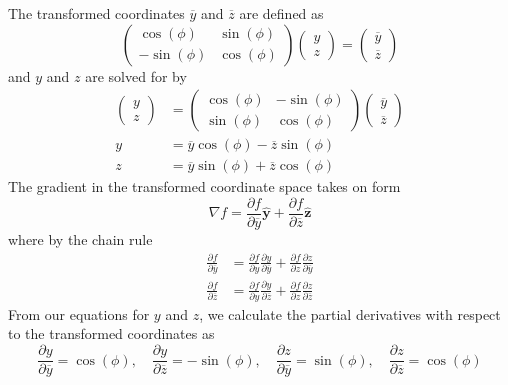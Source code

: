 \documentclass[a4paper]{article}
\begin{document}
The transformed coordinates \( \overline{y} \) and \( \overline{z} \) are defined as 
\[
	\begin{pmatrix}
		\cos\!\left(\phi\right) & \sin\!\left(\phi\right) \\
		-\sin\!\left(\phi\right) & \cos\!\left(\phi\right)
	\end{pmatrix}
	\begin{pmatrix}
		y \\
		z
	\end{pmatrix}
	=
	\begin{pmatrix}
		\overline{y} \\
		\overline{z}
	\end{pmatrix}
\]
and \( y \) and \( z \) are solved for by
\begin{align*}
	\begin{pmatrix}
		y \\
		z
	\end{pmatrix}
	& =
	\begin{pmatrix}
		\cos\!\left(\phi\right) & -\sin\!\left(\phi\right) \\
		\sin\!\left(\phi\right) & \cos\!\left(\phi\right)
	\end{pmatrix}
	\begin{pmatrix}
		\overline{y} \\
		\overline{z}
	\end{pmatrix} \\
	y & = \overline{y}\cos\!\left(\phi\right) - \overline{z}\sin\!\left(\phi\right) \\
	z & = \overline{y}\sin\!\left(\phi\right) + \overline{z}\cos\!\left(\phi\right)
\end{align*}
The gradient in the transformed coordinate space takes on form 
\[
	\nabla f = \frac{\partial f}{\partial \overline{y}}\pmb{\hat{y}} + \frac{\partial f}{\partial \overline{z}}\pmb{\hat{z}} 
\]
where by the chain rule
\begin{align*}
	\frac{\partial f}{\partial \overline{y}} & = \frac{\partial f}{\partial y}\frac{\partial y}{\partial \overline{y}} + \frac{\partial f}{\partial z}\frac{\partial z}{\partial \overline{y}} \\
	\frac{\partial f}{\partial \overline{z}} & = \frac{\partial f}{\partial y}\frac{\partial y}{\partial \overline{z}} + \frac{\partial f}{\partial z}\frac{\partial z}{\partial \overline{z}}
\end{align*}
From our equations for \( y \) and \( z \), we calculate the partial derivatives with respect to the transformed coordinates as 
\[
	\frac{\partial y}{\partial \overline{y}} = \cos\!\left(\phi\right), \quad \frac{\partial y}{\partial \overline{z}} = -\sin\!\left(\phi\right), \quad \frac{\partial z}{\partial \overline{y}} = \sin\!\left(\phi\right), \quad \frac{\partial z}{\partial \overline{z}} = \cos\!\left(\phi\right) 
\]
\end{document}
